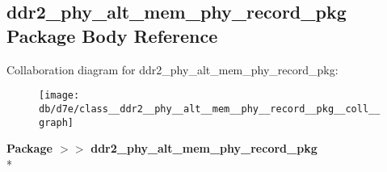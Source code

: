 \subsection{ddr2\+\_\+phy\+\_\+alt\+\_\+mem\+\_\+phy\+\_\+record\+\_\+pkg Package Body Reference}
\label{class__ddr2__phy__alt__mem__phy__record__pkg}


Collaboration diagram for ddr2\+\_\+phy\+\_\+alt\+\_\+mem\+\_\+phy\+\_\+record\+\_\+pkg\+:\nopagebreak
\begin{figure}[H]
\begin{center}
\leavevmode
\texttt{[image: db/d7e/class\_\_ddr2\_\_phy\_\_alt\_\_mem\_\_phy\_\_record\_\_pkg\_\_coll\_\_graph]}
\end{center}
\end{figure}
{\bfseries Package $>$$>$ }{\bf ddr2\+\_\+phy\+\_\+alt\+\_\+mem\+\_\+phy\+\_\+record\+\_\+pkg}\\*
